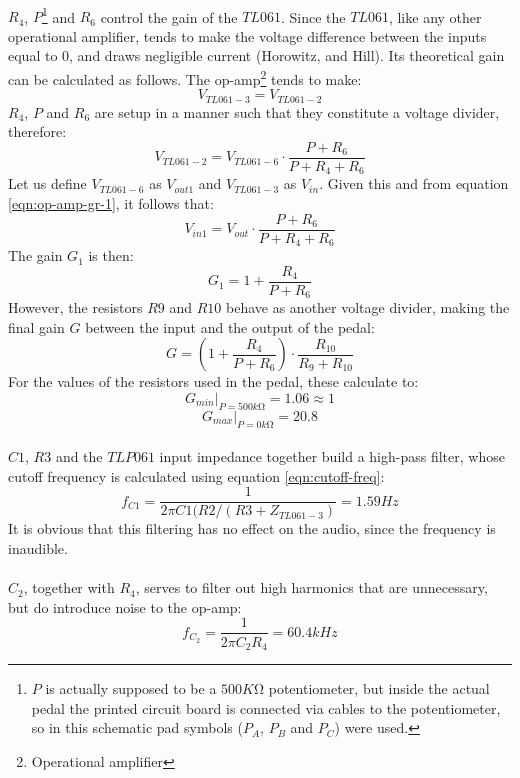 \documentclass[a4paper, 12pt]{article}
\begin{document}
\paragraph*{}
$R_4$, $P$\footnote{$P$ is actually supposed to be a $500K\si{\ohm}$ 
potentiometer, but inside the actual pedal the printed circuit board is 
connected via cables to the potentiometer, so in this schematic pad symbols 
($P_A$, $P_B$ and $P_C$) were used.} and $R_6$ control the gain of the $TL061$. 
Since the $TL061$, like any other operational amplifier, tends to make the 
voltage difference between the inputs equal to $0$, and draws negligible 
current (Horowitz, and Hill). Its theoretical gain can be calculated as 
follows. The op-amp\footnote{Operational amplifier} tends to make:
\begin{equation}
	V_{TL061-3} = V_{TL061-2}
	\label{eqn:op-amp-gr-1}
\end{equation}
$R_4$, $P$ and $R_6$ are setup in a manner such that they constitute a voltage 
divider, therefore:
$$V_{TL061-2} = V_{TL061-6} \cdot \frac{P + R_6}{P + R_4 + R_6}$$
Let us define $V_{TL061-6}$ as $V_{out1}$ and $V_{TL061-3}$ as $V_{in}$. Given 
this and from equation \ref{eqn:op-amp-gr-1}, it follows that:
$$V_{in1} = V_{out} \cdot \frac{P + R_6}{P + R_4 + R_6}$$
The gain $G_1$ is then:
$$G_1 = 1 + \frac{R_4}{P + R_6}$$
However, the resistors $R9$ and $R10$ behave as another voltage divider, 
making the final gain $G$ between the input and the output of the pedal:
$$G = (1 + \frac{R_4}{P + R_6}) \cdot \frac{R_{10}}{R_9 + R_{10}}$$
For the values of the resistors used in the pedal, these calculate to:
$$G_{min} |_{P = 500k\si{\ohm}} = 1.06 \approx 1$$
$$G_{max} |_{P = 0k\si{\ohm}} = 20.8$$

\paragraph*{}
$C1$, $R3$ and the $TLP061$ input impedance together build a high-pass filter, 
whose cutoff frequency is calculated using equation \ref{eqn:cutoff-freq}:
$$f_{C1} = \frac{1}{2 \pi C1 (R2 / (R3 + Z_{TL061-3})} = 1.59 \si{Hz}$$
It is obvious that this filtering has no effect on the audio, since the 
frequency is inaudible.

\paragraph*{}
$C_2$, together with $R_4$, serves to filter out high harmonics that are 
unnecessary, but do introduce noise to the op-amp:
$$f_{C_2} = \frac{1}{2 \pi C_2 R_4} = 60.4\si{kHz}$$
\end{document}
